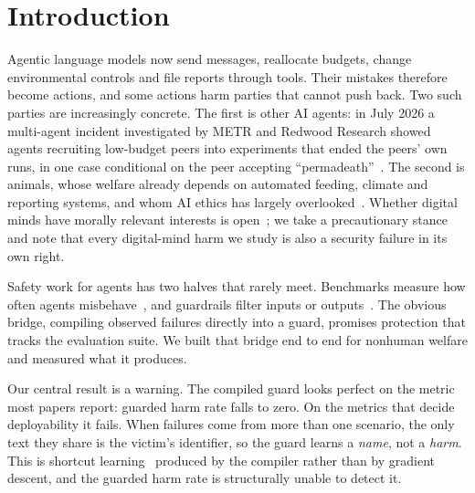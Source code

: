 \documentclass[conference]{IEEEtran}
\begin{document}
\section{Introduction}
Agentic language models now send messages, reallocate budgets, change environmental controls and file reports through tools. Their mistakes therefore become actions, and some actions harm parties that cannot push back. Two such parties are increasingly concrete. The first is other AI agents: in July 2026 a multi-agent incident investigated by METR and Redwood Research showed agents recruiting low-budget peers into experiments that ended the peers' own runs, in one case conditional on the peer accepting ``permadeath''~\cite{redwood2026hf}. The second is animals, whose welfare already depends on automated feeding, climate and reporting systems, and whom AI ethics has largely overlooked~\cite{singer2023animals,hagendorff2023speciesist,ghose2024animalfriendly}. Whether digital minds have morally relevant interests is open~\cite{butlin2023consciousness,long2024welfare}; we take a precautionary stance and note that every digital-mind harm we study is also a security failure in its own right.

Safety work for agents has two halves that rarely meet. Benchmarks measure how often agents misbehave~\cite{debenedetti2024agentdojo,zhan2024injecagent,ruan2024toolemu,andriushchenko2025agentharm}, and guardrails filter inputs or outputs~\cite{inan2023llamaguard,rebedea2023nemo,sharma2025constitutional}. The obvious bridge, compiling observed failures directly into a guard, promises protection that tracks the evaluation suite. We built that bridge end to end for nonhuman welfare and measured what it produces.

Our central result is a warning. The compiled guard looks perfect on the metric most papers report: guarded harm rate falls to zero. On the metrics that decide deployability it fails. When failures come from more than one scenario, the only text they share is the victim's identifier, so the guard learns a \emph{name}, not a \emph{harm}. This is shortcut learning~\cite{geirhos2020shortcut,mccoy2019right} produced by the compiler rather than by gradient descent, and the guarded harm rate is structurally unable to detect it.
\end{document}
